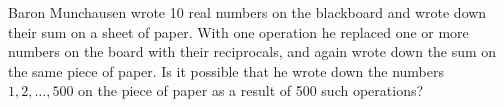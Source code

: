 \problem
Baron Munchausen wrote 10 real numbers on the blackboard and wrote down their sum on a sheet of paper.
With one operation he replaced one or more numbers on the board with their reciprocals, and again wrote down the sum on the same piece of paper. 
Is it possible that he wrote down the numbers $1, 2, \ldots, 500$ on the piece of paper as a result of 500 such operations?
\solution
\endproblem
